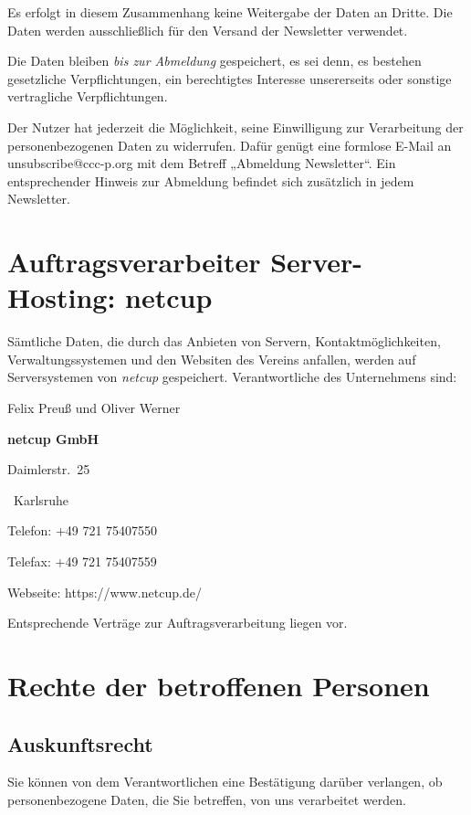 \documentclass[a4paper, 10pt, headings=normal]{scrartcl}
\begin{document}
\begin{multicols*}{2}
Es erfolgt in diesem Zusammenhang keine Weitergabe der Daten an Dritte.
Die Daten werden ausschließlich für den Versand der Newsletter verwendet.

Die Daten bleiben \emph{bis zur Abmeldung} gespeichert, es sei denn, es bestehen gesetzliche Verpflichtungen, ein berechtigtes Interesse unsererseits oder sonstige vertragliche Verpflichtungen.

Der Nutzer hat jederzeit die Möglichkeit, seine Einwilligung zur Verarbeitung der personenbezogenen Daten zu widerrufen.
Dafür genügt eine formlose E-Mail an \textcolor{alert}{unsubscribe@ccc-p.org} mit dem Betreff „Abmeldung Newsletter“. Ein entsprechender Hinweis zur Abmeldung befindet sich zusätzlich in jedem Newsletter.

\section{Auftragsverarbeiter Server-Hosting: netcup}

Sämtliche Daten, die durch das Anbieten von Servern, Kontaktmöglichkeiten, Verwaltungssystemen und den Websiten des Vereins anfallen, werden auf Serversystemen von \emph{netcup} gespeichert.
Verantwortliche des Unternehmens sind:\strut%

\begin{address}\strut%
	\noindent Felix Preuß und Oliver Werner

	\noindent \textbf{netcup GmbH}

	\noindent Daimlerstr.~25

	~Karlsruhe

	\medskip

	\noindent Telefon: +49 721 75407550

	\noindent Telefax: +49 721 75407559

	\noindent Webseite: https://www.netcup.de/\strut
\end{address}

Entsprechende Verträge zur Auftragsverarbeitung liegen vor.

\section{Rechte der betroffenen Personen}

\subsection{Auskunftsrecht}

Sie können von dem Verantwortlichen eine Bestätigung darüber verlangen, ob personenbezogene Daten, die Sie betreffen, von uns verarbeitet werden.


\end{multicols*}
\end{document}
